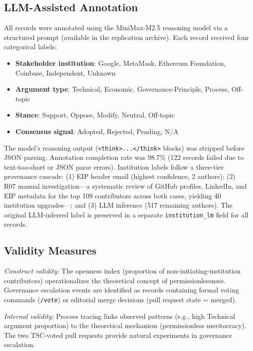 \documentclass[conference]{IEEEtran}
\begin{document}
\subsection{LLM-Assisted Annotation}

All records were annotated using the MiniMax-M2.5 reasoning model via a
structured prompt (available in the replication archive). Each record received four
categorical labels:
\begin{itemize}
  \item \textbf{Stakeholder institution}: Google, MetaMask, Ethereum
        Foundation, Coinbase, Independent, Unknown
  \item \textbf{Argument type}: Technical, Economic, Governance-Principle,
        Process, Off-topic
  \item \textbf{Stance}: Support, Oppose, Modify, Neutral, Off-topic
  \item \textbf{Consensus signal}: Adopted, Rejected, Pending, N/A
\end{itemize}

The model's reasoning output (\texttt{<think>...</think>} blocks) was
stripped before JSON parsing. Annotation completion rate was 98.7\%
(122 records failed due to text-too-short or JSON parse errors). Institution
labels follow a three-tier provenance cascade: (1) EIP header email
(highest confidence, 2 authors); (2) R07 manual investigation---a systematic
review of GitHub profiles, LinkedIn, and EIP metadata for the top 109
contributors across both cases, yielding 40 institution upgrades---;
and (3) LLM inference (517 remaining authors). The original LLM-inferred label
is preserved in a separate \texttt{institution\_lm} field for all records.

\subsection{Validity Measures}

\noindent\textit{Construct validity:} The openness index (proportion of
non-initiating-institution contributors) operationalizes the theoretical
concept of permissionlessness. Governance escalation events are identified
as records containing formal voting commands (\texttt{/vote}) or editorial
merge decisions (pull request state = merged).

\noindent\textit{Internal validity:} Process tracing links observed patterns
(e.g., high Technical argument proportion) to the theoretical mechanism
(permissionless meritocracy). The two TSC-voted pull requests provide
natural experiments in governance escalation.
\end{document}
